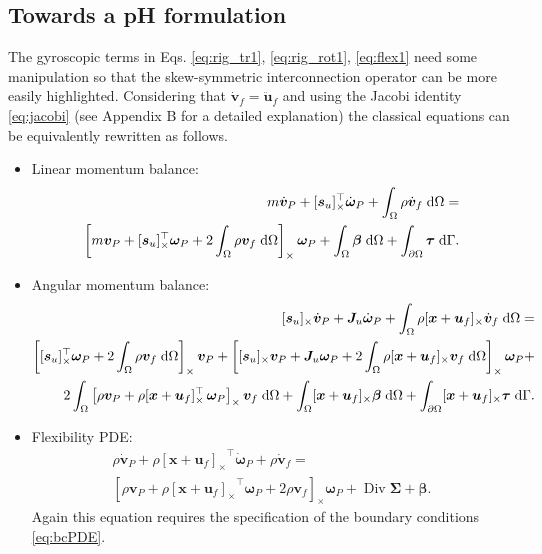 \documentclass{svjour3}                     %
\DeclareMathOperator*{\Div}{Div}
\newcommand{\crmat}[1]{\ensuremath{[#1]_{\times}}}
\begin{document}
\subsection{Towards a pH formulation}
The gyroscopic terms in Eqs. \eqref{eq:rig_tr1}, \eqref{eq:rig_rot1}, \eqref{eq:flex1} need some manipulation so that the skew-symmetric interconnection operator can be more easily highlighted. Considering that $\dot{\bm{v}}_f = \ddot{\bm{u}}_f$ and using the Jacobi identity \eqref{eq:jacobi} (see Appendix B for a detailed explanation) the classical equations can be equivalently rewritten as follows. \\
\begin{itemize}
\item Linear momentum balance:
\begin{equation}
\label{eq:rig_tr2}
\begin{split}
m\dot{\bm{v}}_P + \crmat{\bm{s}_u}^\top \dot{\bm{\omega}}_P +   \int_{\Omega} \rho \dot{\bm{v}}_f \d{\Omega}  = \\
\left[m \bm{v}_P + \crmat{\bm{s}_u}^\top \bm\omega_P +2 \int_{\Omega} \rho \bm{v}_f \d{\Omega} \right]_\times \bm\omega_P +  \int_{\Omega} \bm\beta \d{\Omega} + \int_{\partial \Omega} \bm\tau \d{\Gamma}.
\end{split}
\end{equation}
\item Angular momentum balance:
\begin{equation}
\label{eq:rig_rot2}
\begin{split}
\crmat{\bm{s}_u} \dot{\bm{v}}_P  + \bm{J}_u \dot{\bm\omega}_P + \int_{\Omega} \rho \crmat{\bm{x}+\bm{u}_f} \dot{\bm{v}}_f \d{\Omega} = \\
\left[\crmat{\bm{s}_u}^\top \bm\omega_P + 2 \int_{\Omega} \rho \bm{v}_f \d{\Omega} \right]_\times \bm{v}_P + \left[\crmat{\bm{s}_u} \bm{v}_P + \bm{J}_u \bm\omega_P + 2 \int_{\Omega} \rho \crmat{\bm{x}+\bm{u}_f} {\bm{v}}_f \d{\Omega} \right]_\times \bm\omega_P + 
\\
2 \int_{\Omega} \left[\rho \bm{v}_P + \rho \crmat{\bm{x}+\bm{u}_f}^\top \, \bm\omega_P \right]_\times \bm{v}_f \d{\Omega} + \int_{\Omega}\crmat{\bm{x}+\bm{u}_f} \bm\beta \d{\Omega} + \int_{\partial \Omega}\crmat{\bm{x}+\bm{u}_f} \bm{\tau} \d{\Gamma}.
\end{split}
\end{equation}
\item Flexibility PDE:
\begin{equation}
\label{eq:flex2}
\begin{split}
\rho \dot{\bm{v}}_P + \rho \crmat{\bm{x}+\bm{u}_f}^\top \dot{\bm\omega}_P  + \rho \dot{\bm{v}}_f = \\
\left[\rho \bm{v}_P + \rho \crmat{\bm{x}+\bm{u}_f}^\top \bm\omega_P + 2 \rho \bm{v}_f \right]_\times \bm\omega_P + \Div{\bm\Sigma} + \bm\beta.
\end{split}
\end{equation}
Again this equation requires the specification of the boundary conditions \eqref{eq:bcPDE}.
\end{itemize}
\end{document}
